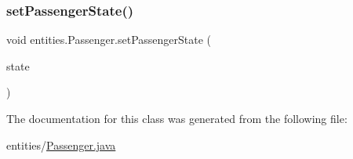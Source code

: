 \mbox{\label{classentities_1_1_passenger_a15abb0fe38c3f003d4a7257e8736a562}} 
\subsubsection{\texorpdfstring{set\+Passenger\+State()}{setPassengerState()}}
{\footnotesize\ttfamily void entities.\+Passenger.\+set\+Passenger\+State (\begin{DoxyParamCaption}\item[{\hyperlink{enumentities_1_1_passenger_enum}{Passenger\+Enum}}]{state }\end{DoxyParamCaption})}



The documentation for this class was generated from the following file\+:\begin{DoxyCompactItemize}
\item 
entities/\hyperlink{_passenger_8java}{Passenger.\+java}\end{DoxyCompactItemize}

